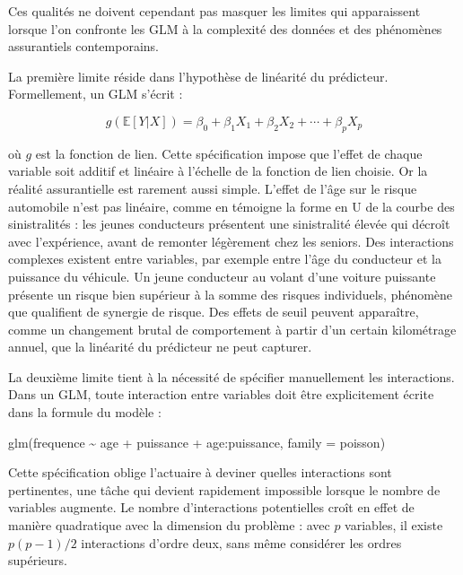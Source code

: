 \documentclass[
  french,
]{book}
\newenvironment{Shaded}{\begin{snugshade}}{\end{snugshade}}
\newcommand{\NormalTok}[1]{#1}
\theoremstyle{definition}
\theoremstyle{definition}
\theoremstyle{definition}
\theoremstyle{definition}
\theoremstyle{remark}
\begin{document}
Ces qualités ne doivent cependant pas masquer les limites qui apparaissent lorsque l'on confronte les GLM à la complexité des données et des phénomènes assurantiels contemporains.

La première limite réside dans l'hypothèse de linéarité du prédicteur. Formellement, un GLM s'écrit :

\begin{equation}
g(\mathbb{E}[Y|X]) = \beta_0 + \beta_1 X_1 + \beta_2 X_2 + \cdots + \beta_p X_p
\end{equation}

où \(g\) est la fonction de lien. Cette spécification impose que l'effet de chaque variable soit additif et linéaire à l'échelle de la fonction de lien choisie. Or la réalité assurantielle est rarement aussi simple. L'effet de l'âge sur le risque automobile n'est pas linéaire, comme en témoigne la forme en U de la courbe des sinistralités : les jeunes conducteurs présentent une sinistralité élevée qui décroît avec l'expérience, avant de remonter légèrement chez les seniors. Des interactions complexes existent entre variables, par exemple entre l'âge du conducteur et la puissance du véhicule. Un jeune conducteur au volant d'une voiture puissante présente un risque bien supérieur à la somme des risques individuels, phénomène que \citet{henckaerts2021boosting} qualifient de synergie de risque. Des effets de seuil peuvent apparaître, comme un changement brutal de comportement à partir d'un certain kilométrage annuel, que la linéarité du prédicteur ne peut capturer.

La deuxième limite tient à la nécessité de spécifier manuellement les interactions. Dans un GLM, toute interaction entre variables doit être explicitement écrite dans la formule du modèle :

\begin{Shaded}
\begin{Highlighting}[]
\NormalTok{glm(frequence \textasciitilde{} age + puissance + age:puissance, family = poisson)}
\end{Highlighting}
\end{Shaded}

Cette spécification oblige l'actuaire à deviner quelles interactions sont pertinentes, une tâche qui devient rapidement impossible lorsque le nombre de variables augmente. Le nombre d'interactions potentielles croît en effet de manière quadratique avec la dimension du problème : avec \(p\) variables, il existe \(p(p-1)/2\) interactions d'ordre deux, sans même considérer les ordres supérieurs.
\end{document}

